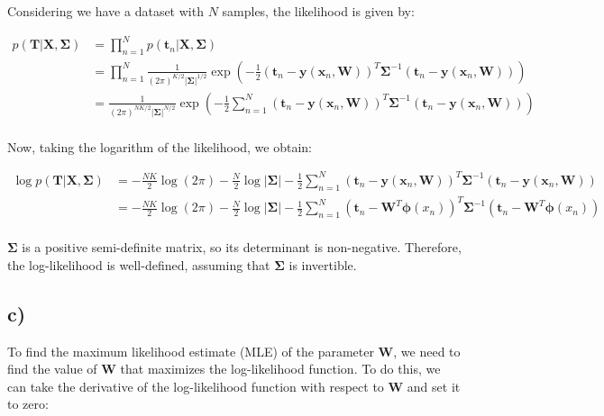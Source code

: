 \documentclass[12pt,a4paper,oneside]{paper}
\begin{document}
Considering we have a dataset with \(N\) samples, the likelihood is given by:

\begin{align*}
p(\mathbf{T} | \mathbf{X}, \mathbf{\Sigma}) &= \prod_{n=1}^{N} p(\bm{t}_n | \mathbf{X}, \mathbf{\Sigma}) \\
&= \prod_{n=1}^{N} \frac{1}{(2\pi)^{K/2} |\mathbf{\Sigma}|^{1/2}} \exp \left( -\frac{1}{2} (\bm{t}_n - \mathbf{y}(\mathbf{x}_n, \mathbf{W}))^T \mathbf{\Sigma}^{-1} (\bm{t}_n - \mathbf{y}(\mathbf{x}_n, \mathbf{W})) \right) \\
&= \frac{1}{(2\pi)^{NK/2} |\mathbf{\Sigma}|^{N/2}} \exp \left( -\frac{1}{2} \sum_{n=1}^{N} (\bm{t}_n - \mathbf{y}(\mathbf{x}_n, \mathbf{W}))^T \mathbf{\Sigma}^{-1} (\mathbf{t}_n - \mathbf{y}(\mathbf{x}_n, \mathbf{W})) \right) \\
\end{align*}

Now, taking the logarithm of the likelihood, we obtain:

\begin{align*}
\log p(\mathbf{T} | \mathbf{X}, \mathbf{\Sigma}) &= -\frac{NK}{2} \log(2\pi) - \frac{N}{2} \log |\mathbf{\Sigma}| - \frac{1}{2} \sum_{n=1}^{N} (\mathbf{t}_n - \mathbf{y}(\mathbf{x}_n, \mathbf{W}))^T \mathbf{\Sigma}^{-1} (\mathbf{t}_n - \mathbf{y}(\mathbf{x}_n, \mathbf{W})) \\
&= -\frac{NK}{2} \log(2\pi) - \frac{N}{2} \log |\bm{\Sigma}| - \frac{1}{2} \sum_{n=1}^{N} (\mathbf{t}_n - \mathbf{W}^T \bm{\phi}(x_n))^T \mathbf{\Sigma}^{-1} (\mathbf{t}_n - \mathbf{W}^T \bm{\phi}(x_n)) \\
\end{align*}

$\bm{\Sigma}$ is a positive semi-definite matrix, so its determinant is non-negative. Therefore, the log-likelihood is well-defined, assuming that $\bm{\Sigma}$ is invertible.

\newpage
\subsection*{c)}

To find the maximum likelihood estimate (MLE) of the parameter \( \mathbf{W} \), we need to find the value of \( \mathbf{W} \) that maximizes the log-likelihood function. To do this, we can take the derivative of the log-likelihood function with respect to \( \mathbf{W} \) and set it to zero:
\end{document}
